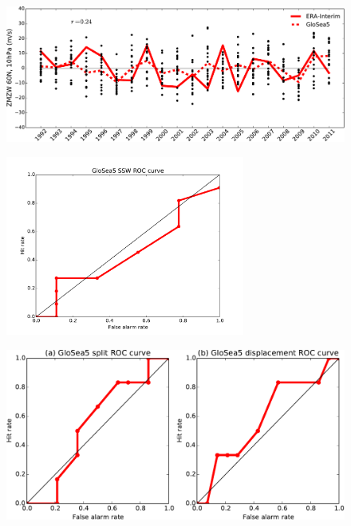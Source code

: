 \begin{figure}[t]
  \noindent\includegraphics[width=\textwidth,angle=0]{figures/chapter-seasonal/DJF_ZMZW_NH.pdf}\\
  \caption[]{}\label{fig:sh_zmzw_clim}
\end{figure}


\begin{figure}[t] \centering
  \noindent\includegraphics[width=0.7\textwidth,angle=0]{figures/chapter-seasonal/SSW_ROC.pdf}\\
  \caption[]{}\label{fig:sh_zmzw_clim}
\end{figure}

\begin{figure}[t] \centering
  \noindent\includegraphics[width=\textwidth,angle=0]{figures/chapter-seasonal/glosea_split_displ_ROC_any.pdf}\\
  \caption[]{}\label{fig:sh_zmzw_clim}
\end{figure}


